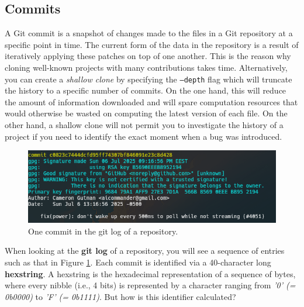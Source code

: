 \subsection{Commits}

A Git commit is a snapshot of changes made to the files in a Git repository at
a specific point in time. The current form of the data in the repository is a
result of iteratively applying these patches on top of one another. This is
the reason why cloning well-known projects with many contributions takes time.
Alternatively, you can create a \textit{shallow clone} by specifying the
\texttt{--depth} flag which will truncate the history to a specific number of
commits. On the one hand, this will reduce the amount of information downloaded
and will spare computation resources that would otherwise be wasted on computing
the latest version of each file. On the other hand, a shallow clone will not
permit you to investigate the history of a project if you need to identify the
exact moment when a bug was introduced.

\begin{figure}[h]
    \centering
    \includegraphics[width=\textwidth,keepaspectratio]{figures/git-log-good.png}
    \caption{One commit in the git log of a repository.}
    \label{fig:git-log}
\end{figure}

When looking at the \textbf{git log} of a repository, you will see a sequence of
entries such as that in Figure \ref{fig:git-log}. Each commit is identified via
a 40-character long \textbf{hexstring}. A hexstring is the hexadecimal
representation of a sequence of bytes, where every nibble (i.e., 4 bits) is
represented by a character ranging from \textit{'0' (= 0b0000)} to \textit{'F'
(= 0b1111)}. But how is this identifier calculated?

